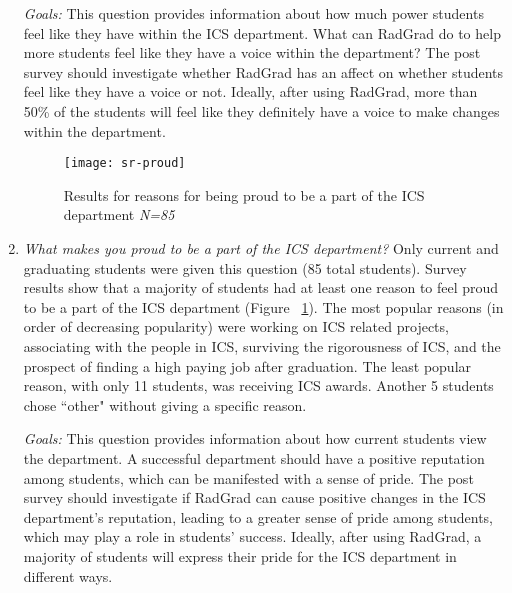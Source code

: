 \begin{enumerate}
\textit{Goals:} This question provides information about how much power students feel like they have within the ICS department. What can RadGrad do to help more students feel like they have a voice within the department? The post survey should investigate whether RadGrad has an affect on whether students feel like they have a voice or not. Ideally, after using RadGrad, more than 50\% of the students will feel like they definitely have a voice to make changes within the department.

\begin{figure}[h]
\centering
\texttt{[image: sr-proud]}
\caption{Results for reasons for being proud to be a part of the ICS department \textit{N=85}}
\label{proud}
\end{figure}
\item \textit{What makes you proud to be a part of the ICS department?}
Only current and graduating students were given this question (85 total students). Survey results show that a majority of students had at least one reason to feel proud to be a part of the ICS department (Figure ~\ref{proud}). The most popular reasons (in order of decreasing popularity) were working on ICS related projects, associating with the people in ICS, surviving the rigorousness of ICS, and the prospect of finding a high paying job after graduation. The least popular reason, with only 11 students, was receiving ICS awards. Another 5 students chose ``other" without giving a specific reason. 

\textit{Goals:} This question provides information about how current students view the department. A successful department should have a positive reputation among students, which can be manifested with a sense of pride. The post survey should investigate if RadGrad can cause positive changes in the ICS department's reputation, leading to a greater sense of pride among students, which may play a role in students' success. Ideally, after using RadGrad, a majority of students will express their pride for the ICS department in different ways. 

\end{enumerate}

